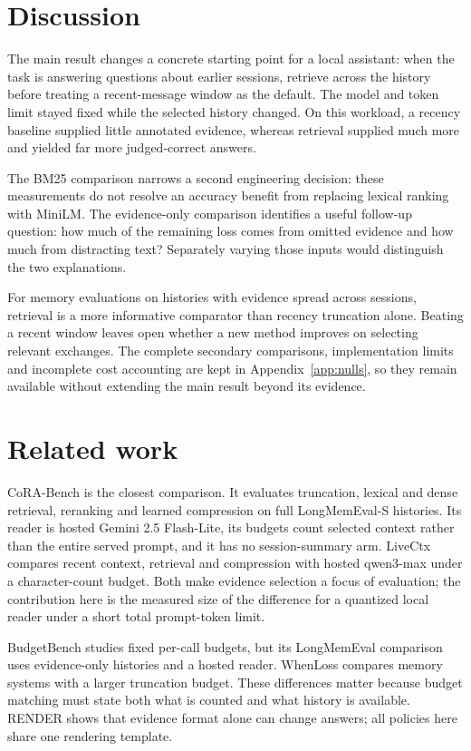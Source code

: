 \documentclass[11pt,letterpaper]{article}
\begin{document}
\section{Discussion}
\label{sec:discussion}
The main result changes a concrete starting point for a local assistant:
when the task is answering questions about earlier sessions, retrieve across
the history before treating a recent-message window as the default. The model
and token limit stayed fixed while the selected history changed. On this
workload, a recency baseline supplied little annotated evidence, whereas
retrieval supplied much more and yielded far more judged-correct answers.

The BM25 comparison narrows a second engineering decision: these measurements
do not resolve an accuracy benefit from replacing lexical ranking with MiniLM.
The evidence-only comparison identifies a useful follow-up question: how much
of the remaining loss comes from omitted evidence and how much from distracting
text? Separately varying those inputs would distinguish the two explanations.

For memory evaluations on histories with evidence spread across sessions,
retrieval is a more informative comparator than recency truncation alone.
Beating a recent window leaves open whether a new method improves on selecting
relevant exchanges. The complete secondary comparisons, implementation limits
and incomplete cost accounting are kept in Appendix~\ref{app:nulls}, so they
remain available without extending the main result beyond its evidence.

\section{Related work}
\label{sec:related}
CoRA-Bench \citep{pardawala2026cora} is the closest comparison. It evaluates
truncation, lexical and dense retrieval, reranking and learned compression on
full LongMemEval-S histories. Its reader is hosted Gemini 2.5 Flash-Lite, its
budgets count selected context rather than the entire served prompt, and it has
no session-summary arm. LiveCtx \citep{liu2026livectx} compares recent context,
retrieval and compression with hosted qwen3-max under a character-count budget.
Both make evidence selection a focus of evaluation; the
contribution here is the measured size of the difference for a quantized local
reader under a short total prompt-token limit.

BudgetBench \citep{rao2026budgetbench} studies fixed per-call budgets, but its
LongMemEval comparison uses evidence-only histories and a hosted reader.
WhenLoss \citep{yu2026whenloss} compares memory systems with a larger
truncation budget. These differences matter because budget matching must state
both what is counted and what history is available. RENDER
\citep{si2026render} shows that evidence format alone can change answers;
all policies here share one rendering template.
\end{document}
